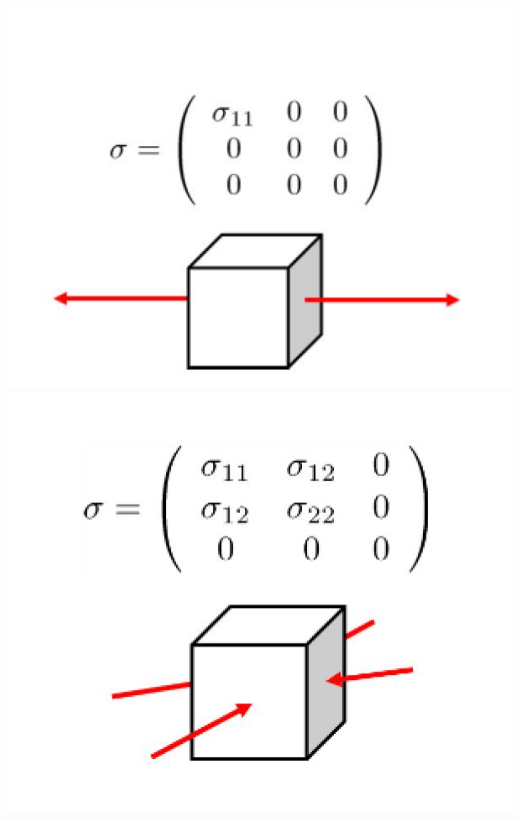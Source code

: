 		\includegraphics[scale=.3]{images/3Dcfuniaxial}				
		\includegraphics[scale=.3]{images/3Dcfplanestress}				
